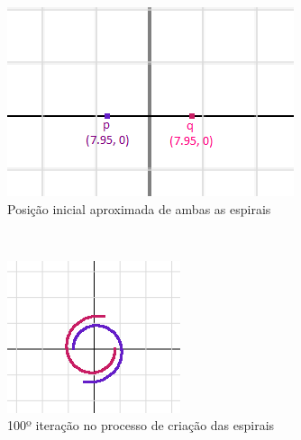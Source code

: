 \begin{enumerate}
  \begin{figure}[!htp]
    \centering
    \begin{subfigure}[b]{0.3\textwidth}
        \centerline{\includegraphics[width=.9\textwidth]{img/cap1_ex6}}
        \caption{Posição inicial aproximada de ambas as espirais}
        \label{fig:cap01_ex6a}
    \end{subfigure}
    ~
    \begin{subfigure}[b]{0.3\textwidth}
        \centerline{\includegraphics[width=.9\textwidth]{img/cap1_ex6b}}
        \caption{100º iteração no processo de criação das espirais}
        \label{fig:cap01_ex6b}
    \end{subfigure}
    ~
    \begin{subfigure}[b]{0.3\textwidth}

\end{subfigure}
\end{figure}
\end{enumerate}
